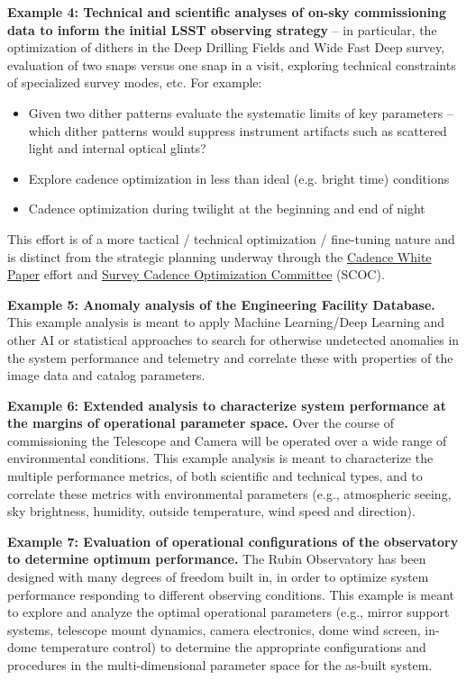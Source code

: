 \documentclass[SE,authoryear,toc]{lsstdoc}
\begin{document}
\textbf{Example 4: Technical and scientific analyses of on-sky commissioning data to inform the initial LSST observing strategy} -- in particular, the optimization of dithers in the Deep Drilling Fields and Wide Fast Deep survey, evaluation of two snaps versus one snap in a visit, exploring technical constraints of specialized survey modes, etc.  For example:
\begin{itemize}
\item Given two dither patterns evaluate the systematic limits of key parameters -- which dither patterns would suppress instrument artifacts such as scattered light and internal optical glints?
\item Explore cadence optimization in less than ideal (e.g. bright time) conditions
\item Cadence optimization during twilight at the beginning and end of night
\end{itemize}
This effort is of a more tactical / technical optimization / fine-tuning nature and is distinct from the strategic planning underway through the \href{https://www.lsst.org/content/survey-cadence-notes-2021}{Cadence White Paper} effort and \href{https://www.lsst.org/content/charge-survey-cadence-optimization-committee-scoc}{Survey Cadence Optimization Committee} (SCOC).

\textbf{Example 5: Anomaly analysis of the Engineering Facility Database.} This example analysis is meant to apply Machine Learning/Deep Learning and other AI or statistical approaches to search for otherwise undetected anomalies in the system performance and telemetry and correlate these with properties of the image data and catalog parameters.
 
\textbf{Example 6: Extended analysis to characterize system performance at the margins of operational parameter space.} Over the course of commissioning the Telescope and Camera will be operated over a wide range of environmental conditions. This example analysis is meant to characterize the multiple performance metrics, of both scientific and technical types, and to correlate these metrics with environmental parameters (e.g., atmospheric seeing, sky brightness, humidity, outside temperature, wind speed and direction).
 
\textbf{Example 7: Evaluation of operational configurations of the observatory to determine optimum performance.} The Rubin Observatory has been designed with many degrees of freedom built in, in order to optimize system performance responding to different observing conditions. This example is meant to explore and analyze the optimal operational parameters (e.g., mirror support systems, telescope mount dynamics, camera electronics, dome wind screen, in-dome temperature control) to determine the appropriate configurations and procedures in the multi-dimensional parameter space for the as-built system.
\end{document}
